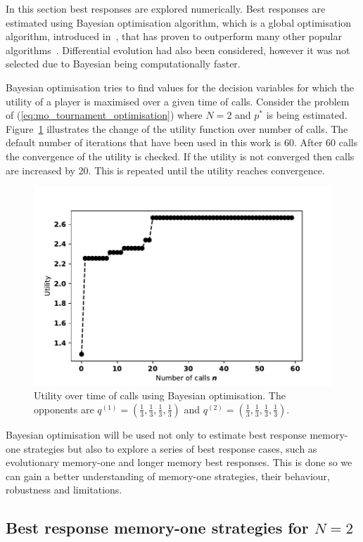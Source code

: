\documentclass[10pt]{article}
\begin{document}
In this section best responses are explored numerically. Best responses are
estimated using Bayesian optimisation algorithm, which is a global optimisation
algorithm, introduced in~\cite{Mokus1978}, that has proven to outperform many
other popular algorithms~\cite{Jones2001}. Differential evolution had also been
considered, however it was not selected due to Bayesian being computationally
faster.

Bayesian optimisation tries to find values for the decision variables for which
the utility of a player is maximised over a given time of calls. Consider the
problem of (\ref{eq:mo_tournament_optimisation}) where \(N=2\) and \(p^*\) is
being estimated. Figure~\ref{bayesian_example} illustrates the change of the
utility function over number of calls. The default number of iterations that
have been used in this work is 60. After 60 calls the convergence of the utility
is checked. If the utility is not converged then calls are increased by 20. This
is repeated until the utility reaches convergence.

\begin{figure}[!htbp]
    \begin{center}
    \includegraphics[width=.5\linewidth]{img/bayesian_example.pdf}
    \end{center}
    \caption{Utility over time of calls using Bayesian optimisation. The
    opponents are \(q^{(1)} = (\frac{1}{3}, \frac{1}{3}, \frac{1}{3},
    \frac{1}{3})\) and \(q^{(2)} = (\frac{1}{3}, \frac{1}{3},
    \frac{1}{3}, \frac{1}{3})\).}
    \label{bayesian_example}
\end{figure}

Bayesian optimisation will be used not only to estimate best response memory-one
strategies but also to explore a series of best response cases, such as evolutionary
memory-one and longer memory best responses. This is done so
we can gain a better understanding of memory-one strategies, their behaviour,
robustness and limitations.

\subsection{Best response memory-one strategies for \(N=2\)}\label{subsection:best_response_n_2}
\end{document}
